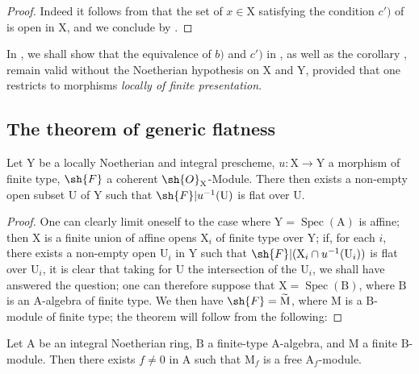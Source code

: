 \begin{proof}
Indeed it follows from  that the set of $x\in\mathrm{X}$ satisfying the condition $c')$ of  is open in $\mathrm{X}$, and we conclude by .
\end{proof}

\begin{remark}[6.8.8]
\label{IV.6.8.8}
In , we shall show that the equivalence of $b)$ and $c')$ in , as well as the corollary , remain valid without the Noetherian hypothesis on $\mathrm{X}$ and $\mathrm{Y}$, provided that one restricts to morphisms \emph{locally of finite presentation}.
\end{remark}

\subsection{The theorem of generic flatness}
\label{subsection:IV.6.9}

\begin{theorem}[6.9.1]
\label{IV.6.9.1}
Let $\mathrm{Y}$ be a locally Noetherian and integral prescheme, $u:\mathrm{X}\to\mathrm{Y}$ a morphism of finite type, $\sh{F}$ a coherent $\sh{O}_\mathrm{X}$-Module. There then exists a non-empty open subset $\mathrm{U}$ of $\mathrm{Y}$ such that $\sh{F}|u^{-1}(\mathrm{U})$ is flat over $\mathrm{U}$.
\end{theorem}

\begin{proof}
One can clearly limit oneself to the case where $\mathrm{Y}=\operatorname{Spec}(\mathrm{A})$ is affine; then $\mathrm{X}$ is a finite union of affine opens $\mathrm{X}_i$ of finite type over $\mathrm{Y}$; if, for each $i$, there exists a non-empty open $\mathrm{U}_i$ in $\mathrm{Y}$ such that $\sh{F}|(\mathrm{X}_i\cap u^{-1}(\mathrm{U}_i))$ is flat over $\mathrm{U}_i$, it is clear that taking for $\mathrm{U}$ the intersection of the $\mathrm{U}_i$, we shall have answered the question; one can therefore suppose that $\mathrm{X}=\operatorname{Spec}(\mathrm{B})$, where $\mathrm{B}$ is an $\mathrm{A}$-algebra of finite type. We then have $\sh{F}=\widetilde{\mathrm{M}}$, where $\mathrm{M}$ is a $\mathrm{B}$-module of finite type; the theorem will follow from the following:
\end{proof}

\begin{lemma}[6.9.2]
\label{IV.6.9.2}
Let $\mathrm{A}$ be an integral Noetherian ring, $\mathrm{B}$ a finite-type $\mathrm{A}$-algebra, and $\mathrm{M}$ a finite $\mathrm{B}$-module. Then there exists $f\neq 0$ in $\mathrm{A}$ such that $\mathrm{M}_f$ is a free $\mathrm{A}_f$-module.
\end{lemma}

